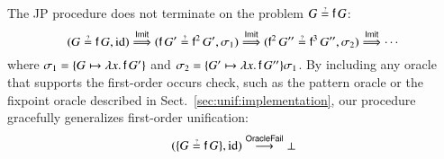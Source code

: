 \begin{exa}
The JP procedure does not terminate on the problem $G \unif \cst{f} \, G$:
\[(G \unif \cst{f} \, G, \makeop{id}) 
\overset{\textsf{Imit}}{\jpunifarrow}
(\cst{f}\,G' \unif \cst{f}^2 \, G', \sigma_1) 
\overset{\textsf{Imit}}{\jpunifarrow}
(\cst{f}^2 \, G'' \unif \cst{f}^3 \, G'', \sigma_2) 
\overset{\textsf{Imit}}{\jpunifarrow}\cdots\]
where $\sigma_1 = \{G \mapsto  \lambda x. \, \mathsf{f} \, G' \}$
and $\sigma_2 = \{G' \mapsto  \lambda x. \, \mathsf{f} \, G'' \}\sigma_1$.
By including any oracle that supports the first-order occurs check, such as the
pattern oracle or the fixpoint oracle described in Sect.~\ref{sec:unif:implementation},
our procedure gracefully generalizes first-order unification: 
\[(\{G \unif \cst{f} \, G\}, \makeop{id}) 
\overset{\textsf{OracleFail}}{\newunifarrow}
\bot
\]
\end{exa}

